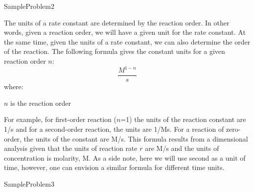 \documentclass[main.tex]{subfiles}
\newcommand\chapterlabel{kinetics}
\begin{document}
\begin{description}
  {SampleProblem2}


The units of a rate constant are determined by the reaction order. In other words, given a reaction order, we will have a given unit for the rate constant. At the same time, given the units of a rate constant, we can also determine the order of the reaction. The following formula gives the constant units for a given reaction order $n$:
\begin{equation}
\boxed{\frac{M^{1-n}}{s} }
\label{\chapterlabel:equation3}
\end{equation}
where:
\begin{where}
 \item $n$   is the reaction order
\end{where}
For example, for first-order reaction ($n$=1) the units of the reaction constant are 1/s and for a second-order reaction, the units are 1/Ms. For a reaction of zero-order, the units of the constant are M/s. This formula results from a dimensional analysis given that the units of reaction rate $r$ are M/s and the units of concentration is molarity, M. As a side note, here we will use second as a unit of time, however, one can envision a similar formula for different time units.

  {SampleProblem3}



\end{description}
\end{document}
